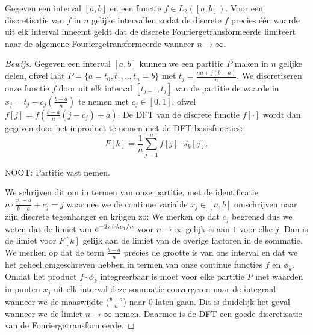 \begin{stelling}
  Gegeven een interval $[a,b]$ en een functie $f\in L_2([a,b])$. 
  Voor een discretisatie van $f$ in $n$ gelijke
  intervallen zodat de discrete $f$ precies \'e\'en waarde uit elk interval inneemt geldt dat de discrete
  Fouriergetransformeerde limiteert naar de algemene Fouriergetransformeerde wanneer $n\to\infty$.
\end{stelling} 
\begin{proof}[Bewijs]
Gegeven een interval $[a,b]$ kunnen we een partitie $P$ maken in $n$ gelijke delen, ofwel laat $P=\{a=t_0,t_1,..,t_n=b\}$ met $t_j = \tfrac{na + j(b-a)}{n}$.
We discretiseren onze functie $f$ door uit elk interval $[t_{j-1},t_{j}]$ van de partitie de waarde in $x_j = t_j - c_j(\tfrac{b-a}{n})$ te nemen met $c_j \in [0,1]$, ofwel
$f[j] = f(\frac{b-a}{n}(j-c_j) + a)$.
De DFT van de discrete functie $f[\cdot]$ wordt dan gegeven door het inproduct te nemen met de DFT-basisfuncties:
\[
F[k] = \frac1n\sum_{j=1}^n f[j] \cdot \overline{s_k}[j].
\]

NOOT: Partitie vast nemen.

We schrijven dit om in termen van onze partitie, met de identificatie $n\cdot\tfrac{x_j-a}{b-a} + c_j= j$ 
waarmee we de continue variable $x_j\in[a,b]$ omschrijven naar zijn discrete tegenhanger en krijgen zo:
We merken op dat $c_j$ begrensd dus we weten dat de limiet van 
$e^{-{2\pi i}\cdot k c_j/n}$ voor $n\to\infty$ gelijk is aan $1$ voor elke $j$. 
Dan is de limiet voor $F[k]$ gelijk aan de limiet van de overige factoren in de sommatie.
We merken op dat de term $\frac{b-a}{n}$ precies de grootte is van ons interval en dat we het geheel
omgeschreven hebben in termen van onze continue functies $f$ en $\phi_k$.
Omdat het product $f\cdot\phi_k$ integreerbaar is moet voor elke partitie $P$ met 
waarden in punten $x_j$ uit elk interval deze sommatie convergeren naar de integraal
wanneer we de maaswijdte ($\tfrac{b-a}{n}$) naar $0$ laten gaan. Dit is duidelijk het geval wanneer we de limiet $n\to\infty$ nemen. Daarmee is de DFT een goede discretisatie van de Fouriergetransformeerde. 
\end{proof}
 
